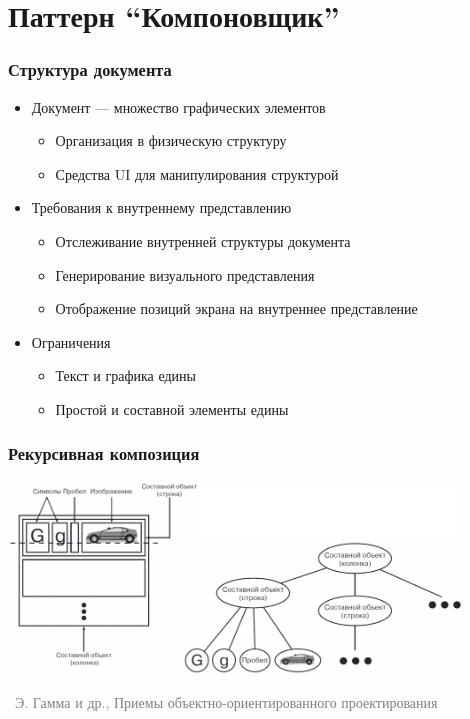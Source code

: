 \documentclass[xetex,mathserif,serif]{beamer}
\newcommand{\attribution}[1] {
	\vspace{-5mm}\begin{flushright}\begin{scriptsize}\textcolor{gray}{\textcopyright\, #1}\end{scriptsize}\end{flushright}
}
\begin{document}
	\section{Паттерн ``Компоновщик''}

	\begin{frame}
		\frametitle{Структура документа}
		\begin{itemize}
			\item Документ --- множество графических элементов
			\begin{itemize}
				\item Организация в физическую структуру
				\item Средства UI для манипулирования структурой
			\end{itemize}
			\item Требования к внутреннему представлению
			\begin{itemize}
				\item Отслеживание внутренней структуры документа
				\item Генерирование визуального представления
				\item Отображение позиций экрана на внутреннее представление
			\end{itemize}
			\item Ограничения
			\begin{itemize}
				\item Текст и графика едины
				\item Простой и составной элементы едины
			\end{itemize}
		\end{itemize}
	\end{frame}

	\begin{frame}
		\frametitle{Рекурсивная композиция}
		\begin{center}
			\includegraphics[width=0.9\textwidth]{recursiveComposition.png}
			\attribution{Э. Гамма и др., Приемы объектно-ориентированного проектирования}
		\end{center}
	\end{frame}
\end{document}
